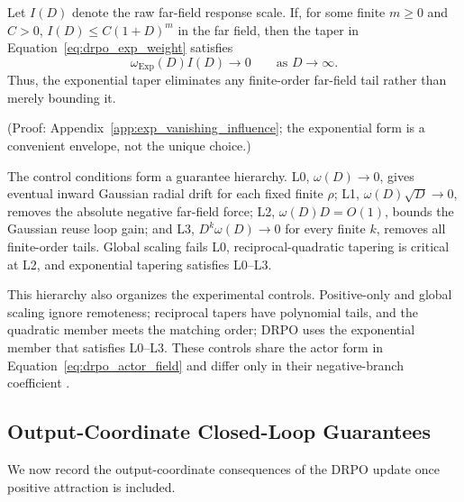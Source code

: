 \documentclass[sigconf,anonymous,review]{acmart}
\theoremstyle{acmdefinition}
\begin{document}
\begin{proposition}
\label{prop:exp_vanishing_influence}
Let \(I(D)\) denote the raw far-field response scale. If, for some
finite \(m\geq0\) and \(C>0\),
\(I(D)\leq C(1+D)^m\) in the far field, then the taper in
Equation~\eqref{eq:drpo_exp_weight} satisfies
\[
    \omega_{\mathrm{Exp}}(D) I(D)
    \longrightarrow 0
    \qquad
    \text{as }D\to\infty .
\]
Thus, the exponential taper eliminates any finite-order far-field tail
rather than merely bounding it.
\end{proposition}

(Proof: Appendix~\ref{app:exp_vanishing_influence}; the exponential form is
a convenient envelope, not the unique choice.)

The control conditions form a guarantee hierarchy. L0,
\(\omega(D)\to0\), gives eventual inward Gaussian radial drift for each
fixed finite \(\rho\); L1, \(\omega(D)\sqrt D\to0\), removes the
absolute negative far-field force; L2, \(\omega(D)D=O(1)\), bounds the
Gaussian reuse loop gain; and L3,
\(D^k\omega(D)\to0\) for every finite \(k\), removes all finite-order
tails. Global scaling fails L0, reciprocal-quadratic tapering is critical at
L2, and exponential tapering satisfies L0--L3. 

This hierarchy also organizes the experimental controls. Positive-only and
global scaling ignore remoteness; reciprocal tapers have polynomial tails, and the quadratic member meets the matching
order; DRPO uses the exponential member that satisfies
L0--L3. These controls share the actor form in
Equation~\eqref{eq:drpo_actor_field} and differ only in their negative-branch
coefficient \citep{peng2019advantage,nair2020awac,kostrikov2021offline,
grigsby2021closer,arnal2025asymmetric,leroux2025tapered}.

\subsection{Output-Coordinate Closed-Loop Guarantees}

We now record the output-coordinate consequences of the DRPO update once
positive attraction is included.
\end{document}
